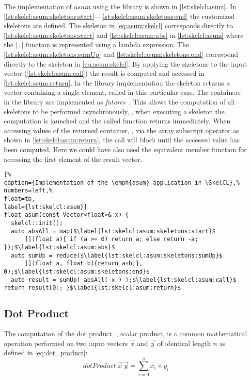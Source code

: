 The implementation of $asum$ using the \SkelCL library is shown in \autoref{lst:skelcl:asum}.
In \autoref{lst:skelcl:asum:skeletons:start}---\autoref{lst:skelcl:asum:skeletons:end} the customized skeletons are defined.
The \map skeleton in \autoref{eq:asum:skelcl} corresponds directly to \autoref{lst:skelcl:asum:skeletons:start} and \autoref{lst:skelcl:asum:abs} in \autoref{lst:skelcl:asum} where the $|\, .\, |$ function is represented using a \Cpp lambda expression.
The \autoref{lst:skelcl:asum:skeletons:sumUp} and \autoref{lst:skelcl:asum:skeletons:end} correspond directly to the \reduce skeleton in \autoref{eq:asum:skelcl}.
By applying the skeletons to the input vector (\autoref{lst:skelcl:asum:call}) the result is computed and accessed in \autoref{lst:skelcl:asum:return}.
In the \SkelCL library implementation the \reduce skeleton returns a vector containing a single element, called  in this particular case.
The containers in the \SkelCL library are implemented as \emph{futures}~\cite{HewittBa1977,FriedmanWi1978}.
This allows the computation of all skeletons to be performed asynchronously, \ie, when executing a skeleton the computation is launched and the called function returns immediately.
When accessing values of the returned container, \eg, via the array subscript operator as shown in \autoref{lst:skelcl:asum:return}, the call will block until the accessed value has been computed.
Here we could have also used the equivalent  member function for accessing the first element of the result vector.

\begin{lstlisting}[%                                                             
caption={Implementation of the \emph{asum} application in \SkelCL},%
numbers=left,%
float=tb,
label={lst:skelcl:asum}]
float asum(const Vector<float>& x) {
  skelcl::init();
  auto absAll = map($\label{lst:skelcl:asum:skeletons:start}$
      [](float a){ if (a >= 0) return a; else return -a; });$\label{lst:skelcl:asum:abs}$
  auto sumUp = reduce($\label{lst:skelcl:asum:skeletons:sumUp}$
      [](float a, float b){return a+b;}, 0);$\label{lst:skelcl:asum:skeletons:end}$
  auto result = sumUp( absAll( x ) );$\label{lst:skelcl:asum:call}$ return result[0]; }$\label{lst:skelcl:asum:return}$
\end{lstlisting}


\subsection*{Dot Product}
\label{sec:dot}
The computation of the dot product, \aka, scalar product, is a common mathematical operation performed on two input vectors $\vec{x}$ and $\vec{y}$ of identical length $n$ as defined in \autoref{eq:dot_product}:
\begin{equation}
  dotProduct\ \vec{x}\ \vec{y} = \sum_{i=0}^{n} x_i \times y_i
  \label{eq:dot_product}
\end{equation}

